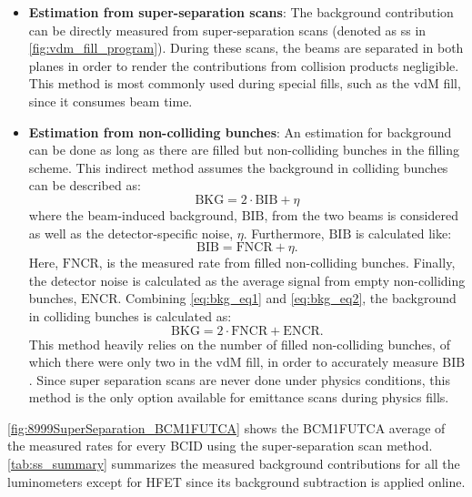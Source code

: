 \begin{itemize}
	\item \textbf{Estimation from super-separation scans}: The background contribution can be directly measured from super-separation scans (denoted as ss in \autoref{fig:vdm_fill_program}). During these scans, the beams are separated in both planes in order to render the contributions from collision products negligible. This method is most commonly used during special fills, such as the vdM fill, since it consumes beam time.
	\item \textbf{Estimation from non-colliding bunches}: An estimation for background can be done as long as there are filled but non-colliding bunches in the filling scheme. This indirect method assumes the background in colliding bunches can be described as:
	\begin{equation}
		\label{eq:bkg_eq1}
		\mathrm{BKG} = 2 \cdot \mathrm{BIB} + \eta
	\end{equation}
	where the beam-induced background, $\mathrm{BIB}$, from the two beams is considered as well as the detector-specific noise, $\eta$. Furthermore, $\mathrm{BIB}$ is calculated like:
	\begin{equation}
		\label{eq:bkg_eq2}
		\mathrm{BIB} = \mathrm{FNCR} + \eta.
	\end{equation}
	Here, $\mathrm{FNCR}$, is the measured rate from filled non-colliding bunches. Finally, the detector noise is calculated as the average signal from empty non-colliding bunches, $\mathrm{ENCR}$. Combining \autoref{eq:bkg_eq1} and \autoref{eq:bkg_eq2}, the background in colliding bunches is calculated as:
	\begin{equation}
		\mathrm{BKG} = 2 \cdot \mathrm{FNCR} + \mathrm{ENCR}.
	\end{equation}
    This method heavily relies on the number of filled non-colliding bunches, of which there were only two in the vdM fill, in order to accurately measure $\mathrm{BIB}$. Since super separation scans are never done under physics conditions, this method is the only option available for emittance scans during physics fills.
\end{itemize}

\autoref{fig:8999SuperSeparation_BCM1FUTCA} shows the BCM1FUTCA average of the measured rates for every BCID using the super-separation scan method. \autoref{tab:ss_summary} summarizes the measured background contributions for all the luminometers except for HFET since its background subtraction is applied online.

